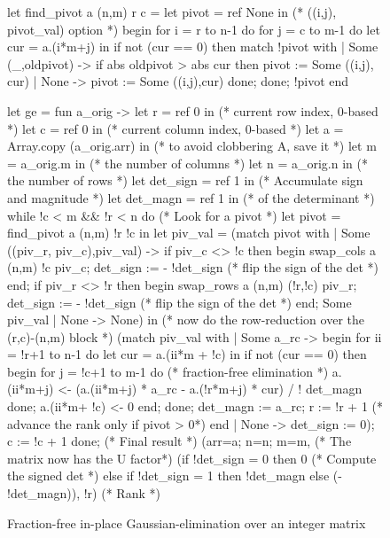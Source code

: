 \documentclass{elsart}
\begin{document}
\begin{figure}
\begin{code}[numbers=left,numberblanklines=false,fontsize=\scriptsize]
let find_pivot a (n,m) r c =
  let pivot = ref None in               (* ((i,j), pivot_val) option *)
  begin
  for i = r to n-1 do
    for j = c to m-1 do
      let cur = a.(i*m+j) in
      if not (cur == 0) then
          match !pivot with
          | Some (_,oldpivot) ->
              if abs oldpivot > abs cur then
                 pivot := Some ((i,j), cur)
          | None -> pivot := Some ((i,j),cur)
  done; done;
  !pivot
  end

let ge = fun a_orig ->
    let r = ref 0 in                    (* current row index, 0-based *)
    let c = ref 0 in                    (* current column index, 0-based *)
    let a = Array.copy (a_orig.arr) in  (* to avoid clobbering A, save it *)
    let m = a_orig.m in                 (* the number of columns *)
    let n = a_orig.n in                 (* the number of rows *)
    let det_sign = ref 1 in             (* Accumulate sign and magnitude *)
    let det_magn = ref 1 in             (*   of the determinant *)
    while !c < m && !r < n do
        (* Look for a pivot *)
        let pivot = find_pivot a (n,m) !r !c in
        let piv_val = (match  pivot with
        | Some ((piv_r, piv_c),piv_val) ->
            if piv_c <> !c then
               begin
                 swap_cols a (n,m) !c piv_c;
                 det_sign := - !det_sign (* flip the sign of the det *)
               end;
            if piv_r <> !r then
               begin
                 swap_rows a (n,m) (!r,!c) piv_r;
                 det_sign := - !det_sign (* flip the sign of the det *)
               end;
            Some piv_val
        | None -> None) in
        (* now do the row-reduction over the (r,c)-(n,m) block *)
        (match piv_val with
        | Some a_rc -> begin
            for ii = !r+1 to n-1 do
                let cur = a.(ii*m + !c) in
                if not (cur == 0)  then
                  begin
                    for j = !c+1 to m-1 do
                      (* fraction-free elimination *)
                      a.(ii*m+j) <- (a.(ii*m+j) * a_rc - a.(!r*m+j) * cur) 
                                    / ! det_magn
                    done;
                    a.(ii*m+ !c) <- 0
                  end;
            done;
            det_magn := a_rc;
            r := !r + 1                 (* advance the rank only if pivot > 0*)
          end
        | None -> det_sign := 0);
        c := !c + 1
    done;
    (* Final result *)
    ({arr=a; n=n; m=m},                 (* The matrix now has the U factor*)
    (if      !det_sign = 0 then  0      (* Compute the signed det *)
     else if !det_sign = 1 then  !det_magn 
     else                        (- !det_magn)),
    !r)                                 (* Rank *)
\end{code}
\caption{Fraction-free in-place Gaussian-elimination over an integer
  matrix}\label{fig:GE-algorithm}
\end{figure}
\end{document}
